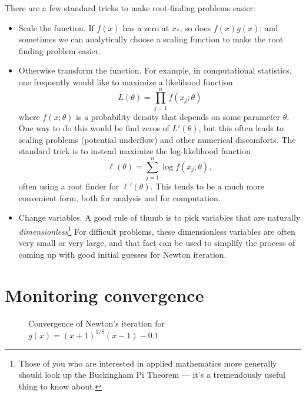 \documentclass[12pt, leqno]{article}
\begin{document}
There are a few standard tricks to make root-finding problems easier:
\begin{itemize}
\item 
  Scale the function.  If $f(x)$ has a zero at $x_*$, so does $f(x)
  g(x)$; and sometimes we can analytically choose a scaling function
  to make the root finding problem easier.
\item
  Otherwise transform the function.  For example, in computational
  statistics, one frequently would like to maximize a likelihood
  function
  \[
    L(\theta) = \prod_{j=1}^n f(x_j; \theta)
  \]
  where $f(x; \theta)$ is a probability density that depends on some
  parameter $\theta$.  One way to do this would be find zeros of
  $L'(\theta)$, but this often leads to scaling problems (potential
  underflow) and other numerical discomforts.  The standard trick is
  to instead maximize the log-likelihood function
  \[
    \ell(\theta) = \sum_{j=1}^n \log f(x_j; \theta),
  \]
  often using a root finder for $\ell'(\theta)$.  This tends to be a
  much more convenient form, both for analysis and for computation.
\item
  Change variables.  A good rule of thumb is to pick variables that
  are naturally {\em dimensionless}\footnote{%
    Those of you who are interested in applied mathematics more
    generally should look up the Buckingham Pi Theorem --- it's a
    tremendously useful thing to know about.  }
  For difficult problems, these dimensionless variables are often very
  small or very large, and that fact can be used to simplify the
  process of coming up with good initial guesses for Newton iteration.
\end{itemize}

\section*{Monitoring convergence}

\begin{figure}
  \hfill
  \caption{Convergence of Newton's iteration for
    $g(x) = (x+1)^{1/8} (x-1) - 0.1$}
  \label{fig:convergence}
\end{figure}
\end{document}
